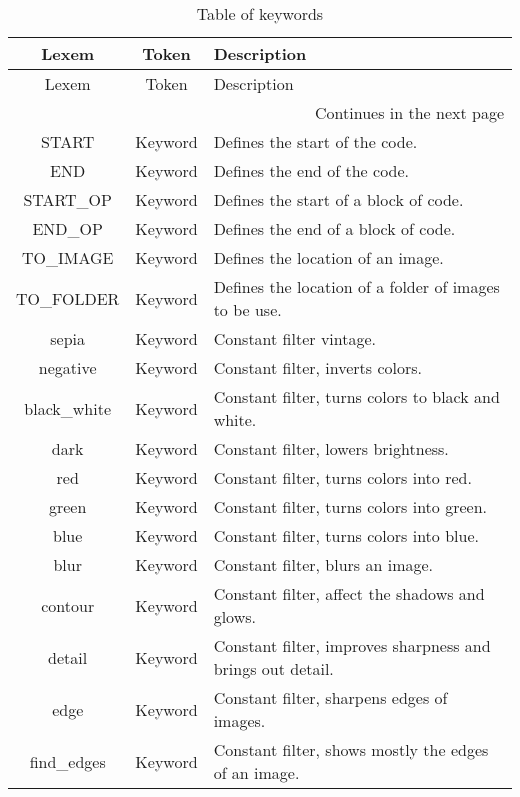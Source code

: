 
\begin{longtable}[c]{|c|c|p{9.5cm}|}
\caption{Table of keywords}\\
\hline
    Lexem & Token & Description \\
\hline
\endfirsthead
\hline
    Lexem & Token & Description \\
\hline
\endhead %
\hline \multicolumn{3}{r}{{Continues in the next page}} \\ \hline
\endfoot %
\hline
\endlastfoot %
\hline

\hline
    START & Keyword & Defines the start of the code. \\
    END & Keyword & Defines the end of the code. \\
    START\_OP & Keyword & Defines the start of a block of code. \\
    END\_OP & Keyword & Defines the end of a block of code. \\
    TO\_IMAGE & Keyword & Defines the location of an image. \\
    TO\_FOLDER & Keyword & Defines the location of a folder of images to be use. \\
    sepia & Keyword & Constant filter vintage. \\
    negative & Keyword & Constant filter, inverts colors. \\
    black\_white & Keyword & Constant filter, turns colors to black and white. \\
    dark & Keyword & Constant filter, lowers brightness. \\
    red & Keyword & Constant filter, turns colors into red. \\
    green & Keyword & Constant filter, turns colors into green. \\
    blue & Keyword & Constant filter, turns colors into blue. \\
    blur & Keyword & Constant filter, blurs an image. \\
    contour & Keyword & Constant filter, affect the shadows and glows. \\
    detail & Keyword & Constant filter, improves sharpness and brings out detail. \\
    edge & Keyword & Constant filter, sharpens edges of images. \\
    find\_edges & Keyword & Constant filter, shows mostly the edges of an image. \\

\end{longtable}
